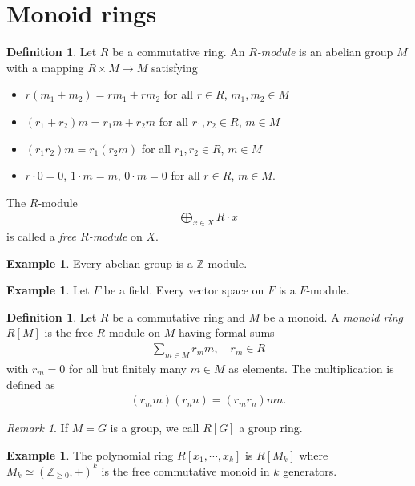 \documentclass[12pt]{report}
\theoremstyle{plain}
\theoremstyle{remark}
\newtheorem*{remark}{Remark}
\theoremstyle{definition}
\newtheorem{definition}[theorem]{Definition}
\newtheorem{example}[theorem]{Example}
\newcommand{\Z}{\mathbb{Z}}
\begin{document}
\clearpage
\section{Monoid rings}

\begin{definition}
    Let $R$ be a commutative ring. An \emph{$R$-module} is an abelian group $M$ with a mapping $R\times M\rightarrow M$ satisfying
    \begin{itemize}
        \item $r(m_1+m_2)=rm_1+rm_2$ for all $r\in R$, $m_1,m_2\in M$
        \item $(r_1+r_2)m=r_1m+r_2m$ for all $r_1,r_2\in R$, $m\in M$
        \item $(r_1r_2)m=r_1(r_2m)$ for all $r_1,r_2\in R$, $m\in M$
        \item $r\cdot 0 = 0$, $1\cdot m = m$, $0\cdot m = 0$ for all $r\in R$, $m\in M$.
    \end{itemize}
    The $R$-module
    \begin{align*}
        \bigoplus_{x\in X} R\cdot x
    \end{align*}
    is called a \emph{free $R$-module} on $X$.
\end{definition}

\begin{example}
    Every abelian group is a $\Z$-module.
\end{example}

\begin{example}
    Let $F$ be a field. Every vector space on $F$ is a $F$-module.
\end{example}

\begin{definition}
    Let $R$ be a commutative ring and $M$ be a monoid. A \emph{monoid ring} $R[M]$ is the free $R$-module on $M$ having formal sums
    \begin{align*}
        \sum_{m\in M} r_m m,\quad r_m\in R
    \end{align*}
    with $r_m=0$ for all but finitely many $m\in M$ as elements. The multiplication is defined as
    \begin{align*}
        (r_m m)(r_n n) = (r_mr_n)mn.
    \end{align*}
\end{definition}
\begin{remark}
    If $M=G$ is a group, we call $R[G]$ a group ring.
\end{remark}

\begin{example}
    The polynomial ring $R[x_1,\cdots,x_k]$ is $R[M_k]$ where $M_k\simeq (\Z_{\ge 0},+)^k$ is the free commutative monoid in $k$ generators.
\end{example}
\end{document}
